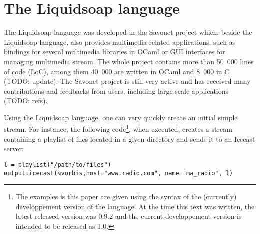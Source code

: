 \documentclass{llncs}
\newcommand{\liquidsoap}{Liquidsoap}
\newcommand{\savonet}{Savonet}
\begin{document}
\section{The \liquidsoap{} language}
\label{sec:lang}

The \liquidsoap{} language was developed in the \savonet{} project \cite{savonet}
which, beside the \liquidsoap{} language, also provides multimedia-related
applications, such as bindings for several multimedia libraries in OCaml or
GUI interfaces for managing multimedia stream. The whole project contains
more than 50~000 lines of code (LoC), among them 40~000 are written in OCaml
and 8~000 in C (TODO: update). The \savonet{} project is still very active
and has received many contributions and feedbacks from users, including
large-scale applications (TODO: refs).

Using the \liquidsoap{} language, one can very quickly create an initial
simple stream. For instance, the following code\footnote{The examples is this paper
are given using the syntax of the (currently) developpement version of the language. 
At the time this text was written, the latest released version was 0.9.2 and 
the current developpement version is intended to be released as 1.0.}, when executed,
creates a stream containing a playlist of files located in a given directory and sends 
it to an Icecast server:
\begin{verbatim}
l = playlist("/path/to/files")
output.icecast(%vorbis,host="www.radio.com", name="ma_radio", l)
\end{verbatim}




\end{document}
